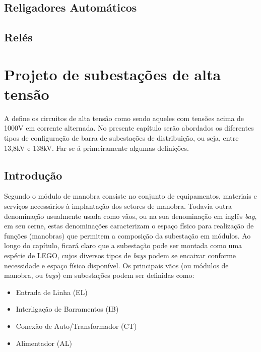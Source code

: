 	\section{Religadores Automáticos}

	\section{Relés}



\chapter{Projeto de subestações de alta tensão}
	\label{chap:projSEAT}
	A  define os circuitos de alta tensão como sendo aqueles com tensões acima de 1000V em corrente alternada. No presente capítulo serão abordados os diferentes tipos de configuração de barra de subestações de distribuição, ou seja, entre 13,8kV e 138kV. Far-se-á primeiramente algumas definições. 

	\section{Introdução}
		Segundo  o módulo de manobra consiste no conjunto de equipamentos, materiais e serviços necessários à implantação dos setores de manobra. Todavia outra denominação usualmente usada como vãos, ou na sua denominação em inglês \textit{bay}, em seu cerne, estas denominações caracterizam o espaço físico para realização de funções (manobras) que permitem a composição da subestação em módulos. Ao longo do capítulo, ficará claro que a subestação pode ser montada como uma espécie de LEGO, cujos diversos tipos de \textit{bays} podem se encaixar conforme necessidade e espaço físico disponível. Os principais vãos (ou módulos de manobra, ou \textit{bays}) em subestações podem ser definidas como:\par

		\begin{itemize}
			\item Entrada de Linha (EL)
			\item Interligação de Barramentos (IB)
			\item Conexão de Auto/Transformador (CT)
			\item Alimentador (AL)
			\end{itemize}
